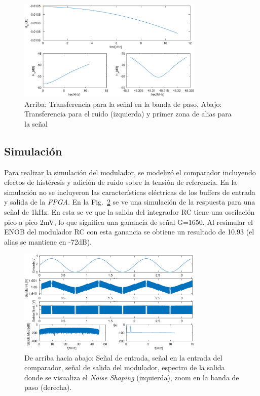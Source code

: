 \documentclass[a4paper,conference]{IEEEtran}
\begin{document}
\begin{figure}[!t]
\centering
\includegraphics[width=3.5in]{Respuesta_Modulador_Combinada}
\caption{Arriba: Transferencia para la se\~nal en la banda de paso. Abajo: Transferencia para el ruido (izquierda) y primer zona de alias para la se\~nal}
\label{fig:Resp_mod}
\end{figure}

\subsection{Simulaci\'on}


Para realizar la simulación del modulador, se modelizó el comparador incluyendo efectos de histéresis y adición de ruido sobre la tensión de referencia. En la simulaci\'on no se incluyeron las caracter\'isticas el\'ectricas de los buffers de entrada y salida de la \textit{FPGA}. En la Fig.~\ref{fig:Sim_mod} se ve una simulaci\'on de la respuesta para una señal de 1kHz. En esta se ve que la salida del integrador RC tiene una oscilación pico a pico 2mV, lo que significa una ganancia de señal G=1650. Al resimular el ENOB del modulador RC con esta ganancia se obtiene un resultado de 10.93 (el alias se mantiene en -72dB).

\begin{figure}[!t]
\centering
\includegraphics[width=3.5in]{Simulacion_Modulador}
\caption{De arriba hacia abajo: Señal de entrada, señal en la entrada del comparador, señal de salida del modulador,  espectro de la salida donde se visualiza el \textit{Noise Shaping} (izquierda), zoom en la banda de paso (derecha).}
\label{fig:Sim_mod}
\end{figure}
\end{document}

